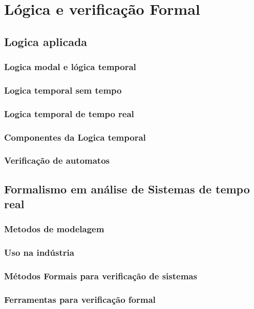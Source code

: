 \chapter{\label{chap:chap2}Lógica e verificação Formal}

\section{\label{sec:secao1}Logica aplicada}
\subsection{Logica modal e lógica temporal}
\subsection{Logica temporal sem tempo}
\subsection{Logica temporal de tempo real}
\subsection{Componentes da Logica temporal}
\subsection{Verificação de automatos}

\section{\label{sec:secao2}Formalismo em análise de Sistemas de tempo real}
\subsection{Metodos de modelagem}
\subsection{Uso na indústria}
\subsection{Métodos Formais para verificação de sistemas}
\subsection{Ferramentas para verificação formal}

